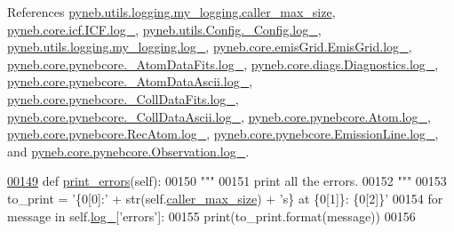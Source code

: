 References \hyperlink{logging_8py_source_l00040}{pyneb.\+utils.\+logging.\+my\+\_\+logging.\+caller\+\_\+max\+\_\+size}, \hyperlink{icf_8py_source_l00015}{pyneb.\+core.\+icf.\+I\+C\+F.\+log\+\_\+}, \hyperlink{_config_8py_source_l00031}{pyneb.\+utils.\+Config.\+\_\+\+Config.\+log\+\_\+}, \hyperlink{logging_8py_source_l00033}{pyneb.\+utils.\+logging.\+my\+\_\+logging.\+log\+\_\+}, \hyperlink{emis_grid_8py_source_l00040}{pyneb.\+core.\+emis\+Grid.\+Emis\+Grid.\+log\+\_\+}, \hyperlink{pynebcore_8py_source_l00080}{pyneb.\+core.\+pynebcore.\+\_\+\+Atom\+Data\+Fits.\+log\+\_\+}, \hyperlink{diags_8py_source_l00168}{pyneb.\+core.\+diags.\+Diagnostics.\+log\+\_\+}, \hyperlink{pynebcore_8py_source_l00301}{pyneb.\+core.\+pynebcore.\+\_\+\+Atom\+Data\+Ascii.\+log\+\_\+}, \hyperlink{pynebcore_8py_source_l00557}{pyneb.\+core.\+pynebcore.\+\_\+\+Coll\+Data\+Fits.\+log\+\_\+}, \hyperlink{pynebcore_8py_source_l00906}{pyneb.\+core.\+pynebcore.\+\_\+\+Coll\+Data\+Ascii.\+log\+\_\+}, \hyperlink{pynebcore_8py_source_l01162}{pyneb.\+core.\+pynebcore.\+Atom.\+log\+\_\+}, \hyperlink{pynebcore_8py_source_l02562}{pyneb.\+core.\+pynebcore.\+Rec\+Atom.\+log\+\_\+}, \hyperlink{pynebcore_8py_source_l03262}{pyneb.\+core.\+pynebcore.\+Emission\+Line.\+log\+\_\+}, and \hyperlink{pynebcore_8py_source_l03418}{pyneb.\+core.\+pynebcore.\+Observation.\+log\+\_\+}.


\begin{DoxyCode}
\hypertarget{classpyneb_1_1utils_1_1logging_1_1my__logging_l00149}{}\hyperlink{classpyneb_1_1utils_1_1logging_1_1my__logging_ac1cd88d7fcf4dd4cc3937af8f6423347}{00149}     \textcolor{keyword}{def }\hyperlink{classpyneb_1_1utils_1_1logging_1_1my__logging_ac1cd88d7fcf4dd4cc3937af8f6423347}{print\_errors}(self):
00150         \textcolor{stringliteral}{"""}
00151 \textcolor{stringliteral}{        print all the errors.}
00152 \textcolor{stringliteral}{        """}
00153         to\_print = \textcolor{stringliteral}{'\{0[0]:'} + str(self.\hyperlink{classpyneb_1_1utils_1_1logging_1_1my__logging_a0449825f771bc794da88ba49666726d5}{caller\_max\_size}) + \textcolor{stringliteral}{'s\} at \{0[1]\}: \{0[2]\}'} 
00154         \textcolor{keywordflow}{for} message \textcolor{keywordflow}{in} self.\hyperlink{classpyneb_1_1utils_1_1logging_1_1my__logging_a4bda17b594629b5490207080dbcb3bbd}{log\_}[\textcolor{stringliteral}{'errors'}]:
00155             print(to\_print.format(message))
00156     
\end{DoxyCode}
\hypertarget{classpyneb_1_1utils_1_1logging_1_1my__logging_aa982aaf0aa003e1d477bcf822e12282d}{}
